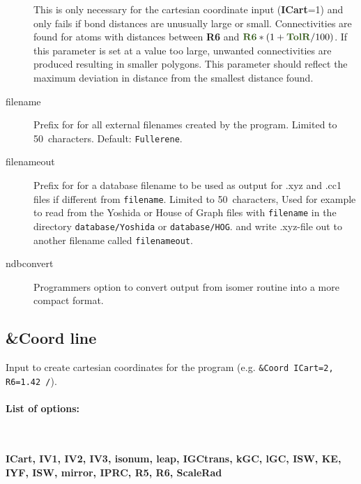 \documentclass[article,a4paper,twoside]{memoir}
\newcommand{\filename}[1]{\texttt{#1}}
\newcommand{\paramname}[1]{{\color{green}\textbf{#1}}}
\begin{document}
\begin{description}
  This is only necessary for the cartesian coordinate input (\paramname{ICart}=1) and only fails if bond distances are unusually large or small. 
  Connectivities are found for atoms with distances between \paramname{R6} and $\paramname{R6}*(1+\paramname{TolR}/100)$. 
  If this parameter is set at a value too large, unwanted connectivities are produced resulting in smaller polygons. 
  This parameter should reflect the maximum deviation in distance from the smallest distance found.
\item[{filename}] 
    Prefix for for all external filenames created by the program. Limited to 50~characters. Default: \filename{Fullerene}.
\item[{filenameout}] 
    Prefix for for a database filename to be used as output for .xyz and .cc1 files if different from \filename{filename}. Limited to 50~characters, 
    Used for example to read from the Yoshida or House of Graph files with \filename{filename} in the directory \filename{database/Yoshida} or \filename{database/HOG}.
    and write .xyz-file out to another filename called \filename{filenameout}.
\item[{ndbconvert}] Programmers option to convert output from isomer routine into a more compact format.
\end{description}


\subsection{\&Coord line}

Input to create cartesian coordinates for the program (e.g. \verb|&Coord ICart=2, R6=1.42 /|).
\paragraph{List of options:}\ 

\paramname{ICart, IV1, IV2, IV3, isonum, leap, IGCtrans, kGC, lGC, ISW, KE, IYF, ISW, mirror, IPRC, R5, R6, ScaleRad}
\end{document}
